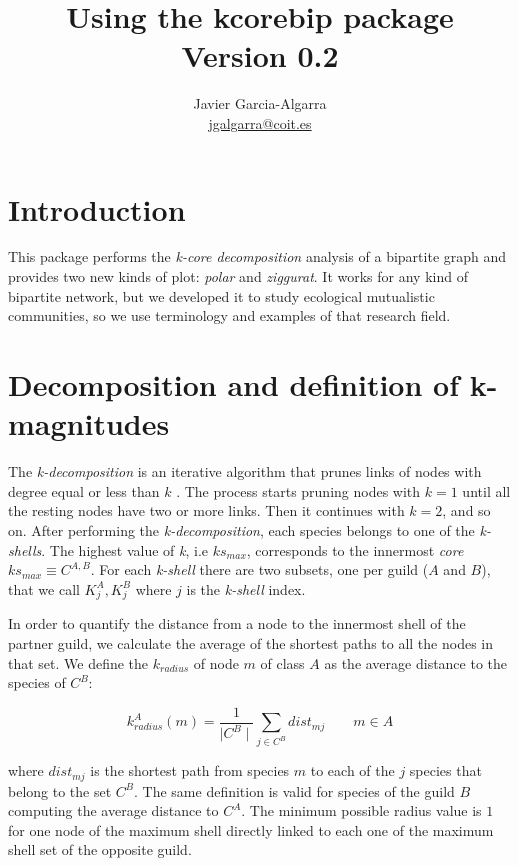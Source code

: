 \documentclass[12pt]{article}
\title{Using the kcorebip package \\ \small{Version 0.2}}
\author{Javier Garcia-Algarra \\ \href{mailto:jgalgarra@coit.es}{jgalgarra@coit.es} }
\begin{document}
\flushbottom
\maketitle
\thispagestyle{empty}

\section*{Introduction}

This package performs the \textit{k-core decomposition} analysis of a bipartite graph and provides two new kinds of plot: \textit{polar} and \textit{ziggurat}. It works for
any kind of bipartite network, but we developed it to study ecological mutualistic communities, so we use terminology and examples of that research field.

\section*{Decomposition and definition of k-magnitudes}
\label{K-magnitudes}

The \textit{k-decomposition} is an iterative algorithm that prunes links of nodes with degree equal or less than $k$ \cite{seidman1983network}. The process starts pruning nodes with $k=1$ until all the resting nodes have two or more links. Then it continues with $k=2$, and so on. After performing the \textit{k-decomposition}, each species belongs to one of the \textit{k-shells}. The highest value of \textit{k}, i.e $ks_{max}$, corresponds to the innermost \textit{core} $ks_{max}\equiv C^{A,B}$. For each \textit{k-shell} there are two subsets, one per guild ($A$ and $B$), that we call $K^{A}_{j}, K^{B}_{j}$ where $j$ is the \textit{k-shell} index.

In order to quantify the distance from a node to the innermost shell of the partner guild, we calculate the average of the shortest paths to all the nodes in that set. We define the \textit{$k_{radius}$} of node $m$ of class $A$ as the average distance to the species of $C^B$:

\begin{equation}
\displaystyle
k^A_{radius}(m) = \frac{1}{\mid C^{B} \mid}\sum\limits_{j \in C^{B}} dist_{mj}  \qquad   m \in A
\label{kradius}
\end{equation}

\noindent where $dist_{mj}$ is the shortest path from species $m$ to each of the $j$ species that belong to the set $C^B$. The same definition is valid for species of the guild $B$ computing the average distance to $C^A$. The minimum possible radius value is $1$ for one node of the maximum shell directly linked to each one of the maximum shell set of the opposite guild.
\end{document}
